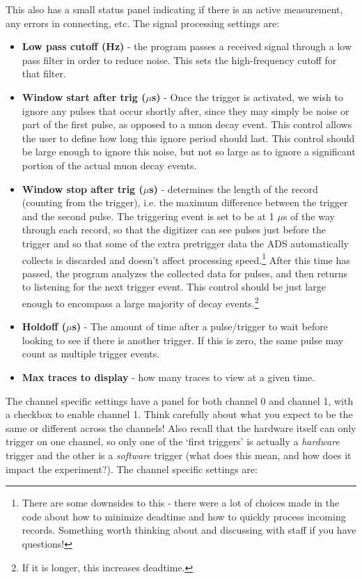 \documentclass{../lab}
\begin{document}
This also has a small status panel indicating if there is an active measurement, any errors in connecting, etc. The signal processing settings are:

\begin{itemize}
    \item \textbf{Low pass cutoff (Hz)} - the program passes a received signal through a low pass filter in order to reduce noise. This sets the high-frequency cutoff for that filter.
    \item \textbf{Window start after trig ($\mu$s)} - Once the trigger is activated, we wish to ignore any pulses that occur shortly after, since they may simply be noise or part of the first pulse, as opposed to a muon decay event. This control allows the user to define how long this ignore period should last. This control should be large enough to ignore this noise, but not so large as to ignore a significant portion of the actual muon decay events.
    \item \textbf{Window stop after trig ($\mu$s) }- determines the length of the record (counting from the trigger), i.e. the maximum difference between the trigger and the second pulse. The triggering event is set to be at 1 $\mu$s of the way through each record, so that the digitizer can see pulses just before the trigger and so that some of the extra pretrigger data the ADS automatically collects is discarded and doesn't affect processing speed.\footnote{There are some downsides to this - there were a lot of choices made in the code about how to minimize deadtime and how to quickly process incoming records. Something worth thinking about and discussing with staff if you have questions!} After this time has passed, the program analyzes the collected data for pulses, and then returns to listening for the next trigger event. This control should be just large enough to encompass a large majority of decay events.\footnote{If it is longer, this increases deadtime.}
    \item \textbf{Holdoff ($\mu$s)} - The amount of time after a pulse/trigger to wait before looking to see if there is another trigger. If this is zero, the same pulse may count as multiple trigger events.
    \item \textbf{Max traces to display} - how many traces to view at a given time.
\end{itemize}

The channel specific settings have a panel for both channel 0 and channel 1, with a checkbox to enable channel 1. Think carefully about what you expect to be the same or different across the channels! Also recall that the hardware itself can only trigger on one channel, so only one of the `first triggers' is actually a \textit{hardware} trigger and the other is a \textit{software} trigger (what does this mean, and how does it impact the experiment?). The channel specific settings are:
\end{document}
